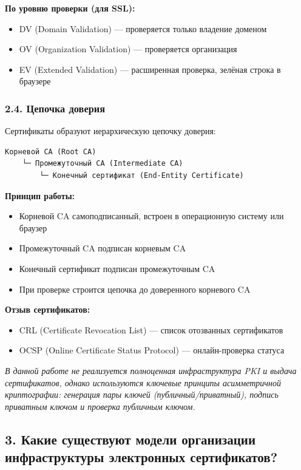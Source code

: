 \textbf{По уровню проверки (для SSL):}
\begin{itemize}
    \item DV (Domain Validation) — проверяется только владение доменом
    \item OV (Organization Validation) — проверяется организация
    \item EV (Extended Validation) — расширенная проверка, зелёная строка в браузере
\end{itemize}

\subsubsection*{2.4. Цепочка доверия}

Сертификаты образуют иерархическую цепочку доверия:

\begin{verbatim}
Корневой CA (Root CA)
    └─ Промежуточный CA (Intermediate CA)
        └─ Конечный сертификат (End-Entity Certificate)
\end{verbatim}

\textbf{Принцип работы:}
\begin{itemize}
    \item Корневой CA самоподписанный, встроен в операционную систему или браузер
    \item Промежуточный CA подписан корневым CA
    \item Конечный сертификат подписан промежуточным CA
    \item При проверке строится цепочка до доверенного корневого CA
\end{itemize}

\textbf{Отзыв сертификатов:}
\begin{itemize}
    \item CRL (Certificate Revocation List) — список отозванных сертификатов
    \item OCSP (Online Certificate Status Protocol) — онлайн-проверка статуса
\end{itemize}

\textit{В данной работе не реализуется полноценная инфраструктура PKI и выдача сертификатов, однако используются ключевые принципы асимметричной криптографии: генерация пары ключей (публичный/приватный), подпись приватным ключом и проверка публичным ключом.}

\subsection*{3. Какие существуют модели организации инфраструктуры электронных сертификатов?}


